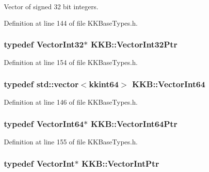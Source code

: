 Vector of signed 32 bit integers. 



Definition at line 144 of file K\+K\+Base\+Types.\+h.

\subsubsection[{\texorpdfstring{Vector\+Int32\+Ptr}{VectorInt32Ptr}}]{\setlength{\rightskip}{0pt plus 5cm}typedef {\bf Vector\+Int32}$\ast$ {\bf K\+K\+B\+::\+Vector\+Int32\+Ptr}}\hypertarget{namespace_k_k_b_a0a0457effc318aa340f69262261760eb}{}\label{namespace_k_k_b_a0a0457effc318aa340f69262261760eb}


Definition at line 154 of file K\+K\+Base\+Types.\+h.

\subsubsection[{\texorpdfstring{Vector\+Int64}{VectorInt64}}]{\setlength{\rightskip}{0pt plus 5cm}typedef std\+::vector$<${\bf kkint64}$>$ {\bf K\+K\+B\+::\+Vector\+Int64}}\hypertarget{namespace_k_k_b_a53584303a9b1e1ae8f4c72034685bf99}{}\label{namespace_k_k_b_a53584303a9b1e1ae8f4c72034685bf99}


Definition at line 146 of file K\+K\+Base\+Types.\+h.

\subsubsection[{\texorpdfstring{Vector\+Int64\+Ptr}{VectorInt64Ptr}}]{\setlength{\rightskip}{0pt plus 5cm}typedef {\bf Vector\+Int64}$\ast$ {\bf K\+K\+B\+::\+Vector\+Int64\+Ptr}}\hypertarget{namespace_k_k_b_a9249e96328ebcbaa92560e5ffbd589ec}{}\label{namespace_k_k_b_a9249e96328ebcbaa92560e5ffbd589ec}


Definition at line 155 of file K\+K\+Base\+Types.\+h.

\subsubsection[{\texorpdfstring{Vector\+Int\+Ptr}{VectorIntPtr}}]{\setlength{\rightskip}{0pt plus 5cm}typedef {\bf Vector\+Int}$\ast$ {\bf K\+K\+B\+::\+Vector\+Int\+Ptr}}\hypertarget{namespace_k_k_b_a0fb33b081f971e43176068897f27428f}{}\label{namespace_k_k_b_a0fb33b081f971e43176068897f27428f}



